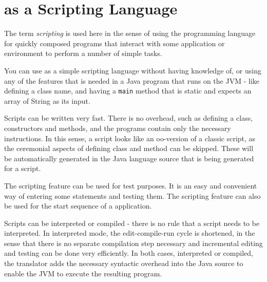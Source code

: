 \chapter{\nr{} as a Scripting Language}
The term \emph{scripting} is used here in the sense of using the
programming language for quickly composed programs that interact with
some application or environment to perform a number of simple tasks.

You can use \nr{} as a simple scripting language without having
knowledge of, or using any of the features that is needed in a Java
program that runs on the JVM - like defining a class name, and having
a \texttt{main} method that is static and expects an array of String
as its input. 

Scripts can be written very fast. There is
no overhead, such as defining a class, constructors and methods, and the programs contain only
the necessary instructions. In this sense, a \nr{} script looks like
an oo-version of a classic script, as the ceremonial aspects of defining
class and method can be skipped. These will be automatically generated
in the Java language source that is being generated for a script.

The scripting feature can be used for test purposes. It is an easy and convenient way of entering some statements and testing them.
The scripting feature can also be used for the start sequence of a \nr{} application.

Scripts can be interpreted or compiled - there is no rule that a
script needs to be interpreted. In interpreted mode, the
edit-compile-run cycle is shortened, in the sense that there is no separate compilation
step necessary and incremental editing and testing can be done very efficiently. In both cases, interpreted or
compiled, the \nr{} translator adds the necessary syntactic overhead
into the Java source to enable
the JVM to execute the resulting program.

